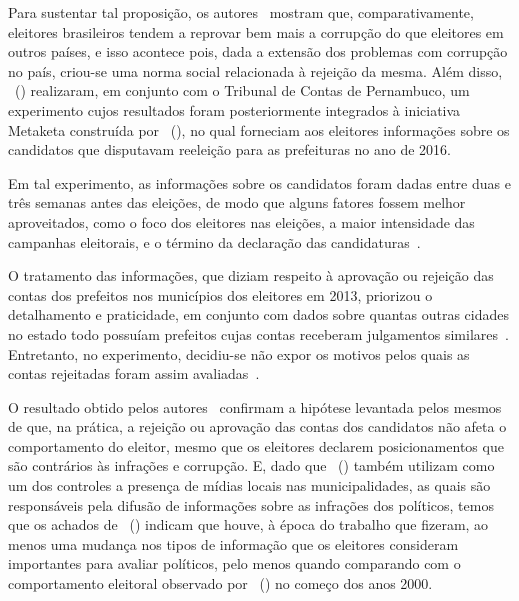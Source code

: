 \documentclass[
	12pt,				%
	openright,			%
	twoside,			%
	a4paper,			%
	openany,
	english,			%
	brazil				%
	]{abntex2}
\begin{document}
Para sustentar tal proposição, os autores~\cite{Boas2019Apr} mostram que, comparativamente, eleitores brasileiros tendem a reprovar bem mais a corrupção do que eleitores em outros países, e isso acontece pois, dada a extensão dos problemas com corrupção no país, criou-se uma norma social relacionada à rejeição da mesma. Além disso, ~(\citeyear{Boas2019Apr}) realizaram, em conjunto com o Tribunal de Contas de Pernambuco, um experimento cujos resultados foram posteriormente integrados à iniciativa Metaketa construída por ~(\citeyear{dunning2019voter}), no qual forneciam aos eleitores informações sobre os candidatos que disputavam reeleição para as prefeituras no ano de 2016.

Em tal experimento, as informações sobre os candidatos foram dadas entre duas e três semanas antes das eleições, de modo que alguns fatores fossem melhor aproveitados, como o foco dos eleitores nas eleições, a maior intensidade das campanhas eleitorais, e o término da declaração das candidaturas~\cite{Boas2019Apr}.

O tratamento das informações, que diziam respeito à aprovação ou rejeição das contas dos prefeitos nos municípios dos eleitores em 2013, priorizou o detalhamento e praticidade, em conjunto com dados sobre quantas outras cidades no estado todo possuíam prefeitos cujas contas receberam julgamentos similares~\cite{Boas2019Apr}. Entretanto, no experimento, decidiu-se não expor os motivos pelos quais as contas rejeitadas foram assim avaliadas~\cite{Boas2019Apr}.

O resultado obtido pelos autores~\cite{Boas2019Apr} confirmam a hipótese levantada pelos mesmos de que, na prática, a rejeição ou aprovação das contas dos candidatos não afeta o comportamento do eleitor, mesmo que os eleitores declarem posicionamentos que são contrários às infrações e corrupção. E, dado que ~(\citeyear{ferraz2008exposing}) também utilizam como um dos controles a presença de mídias locais nas municipalidades, as quais são responsáveis pela difusão de informações sobre as infrações dos políticos, temos que os achados de ~(\citeyear{Boas2019Apr}) indicam que houve, à época do trabalho que fizeram, ao menos uma mudança nos tipos de informação que os eleitores consideram importantes para avaliar políticos, pelo menos quando comparando com o comportamento eleitoral observado por ~(\citeyear{ferraz2008exposing}) no começo dos anos 2000.
\end{document}
